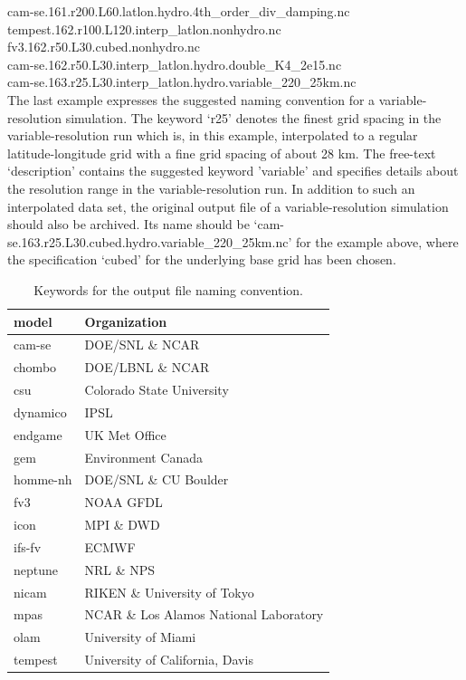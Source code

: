 \documentclass[times,doublespace]{fldauth}
\newcommand\T{\rule{0pt}{2.6ex}}
\newcommand\B{\rule[-1.2ex]{0pt}{0pt}}
\begin{document}
\noindent
cam-se.161.r200.L60.latlon.hydro.4th\_order\_div\_damping.nc \\
tempest.162.r100.L120.interp\_latlon.nonhydro.nc \\
fv3.162.r50.L30.cubed.nonhydro.nc \\
cam-se.162.r50.L30.interp\_latlon.hydro.double\_K4\_2e15.nc \\
cam-se.163.r25.L30.interp\_latlon.hydro.variable\_220\_25km.nc \\

The last example expresses the suggested naming convention for a variable-resolution simulation. The keyword `r25' denotes the finest grid spacing in the variable-resolution run which is, in this example,  interpolated to a regular latitude-longitude grid with a fine grid spacing of about 28 km. The free-text `description' contains the suggested keyword 'variable' and specifies details about the resolution range in the variable-resolution run. In addition to such an interpolated data set, the original output file of a variable-resolution simulation should also be archived. Its name should be `cam-se.163.r25.L30.cubed.hydro.variable\_220\_25km.nc'  for the example above, where the specification `cubed' for the underlying base grid has been chosen.

\begin{table}[h]
\caption{Keywords for the output file naming convention.} \label{tab:keywords}
\begin{tabular*}{\textwidth}{ll}
\hline
model \hspace{2cm}\T \B & Organization  \\ \hline 
cam-se &  DOE/SNL \& NCAR \\
chombo &  DOE/LBNL \& NCAR \\
csu  \B & Colorado State University  \\ \hline 
dynamico & IPSL \\
endgame &  UK Met Office\\
gem & Environment Canada \\
homme-nh & DOE/SNL \& CU Boulder \\
fv3 & NOAA GFDL \\
icon & MPI \& DWD \\
ifs-fv & ECMWF \\
neptune & NRL \& NPS \\
nicam & RIKEN \& University of Tokyo \\
mpas & NCAR \& Los Alamos National Laboratory \\
olam & University of Miami \\
tempest & University of California, Davis \\
\hline 
\end{tabular*}
\end{table}
\end{document}

